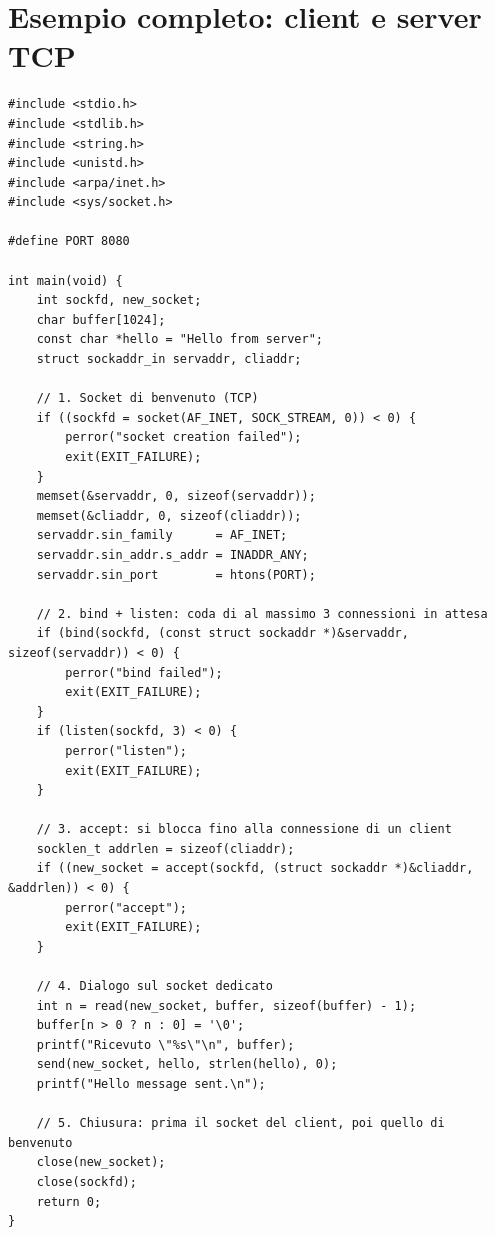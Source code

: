 
\section{Esempio completo: client e server TCP}

\begin{lstlisting}[language={[POSIX]C}, style=wnumbers, title={tcp\_server.c}]
#include <stdio.h>
#include <stdlib.h>
#include <string.h>
#include <unistd.h>
#include <arpa/inet.h>
#include <sys/socket.h>

#define PORT 8080

int main(void) {
    int sockfd, new_socket;
    char buffer[1024];
    const char *hello = "Hello from server";
    struct sockaddr_in servaddr, cliaddr;

    // 1. Socket di benvenuto (TCP)
    if ((sockfd = socket(AF_INET, SOCK_STREAM, 0)) < 0) {
        perror("socket creation failed");
        exit(EXIT_FAILURE);
    }
    memset(&servaddr, 0, sizeof(servaddr));
    memset(&cliaddr, 0, sizeof(cliaddr));
    servaddr.sin_family      = AF_INET;
    servaddr.sin_addr.s_addr = INADDR_ANY;
    servaddr.sin_port        = htons(PORT);

    // 2. bind + listen: coda di al massimo 3 connessioni in attesa
    if (bind(sockfd, (const struct sockaddr *)&servaddr, sizeof(servaddr)) < 0) {
        perror("bind failed");
        exit(EXIT_FAILURE);
    }
    if (listen(sockfd, 3) < 0) {
        perror("listen");
        exit(EXIT_FAILURE);
    }

    // 3. accept: si blocca fino alla connessione di un client
    socklen_t addrlen = sizeof(cliaddr);
    if ((new_socket = accept(sockfd, (struct sockaddr *)&cliaddr, &addrlen)) < 0) {
        perror("accept");
        exit(EXIT_FAILURE);
    }

    // 4. Dialogo sul socket dedicato
    int n = read(new_socket, buffer, sizeof(buffer) - 1);
    buffer[n > 0 ? n : 0] = '\0';
    printf("Ricevuto \"%s\"\n", buffer);
    send(new_socket, hello, strlen(hello), 0);
    printf("Hello message sent.\n");

    // 5. Chiusura: prima il socket del client, poi quello di benvenuto
    close(new_socket);
    close(sockfd);
    return 0;
}
\end{lstlisting}

